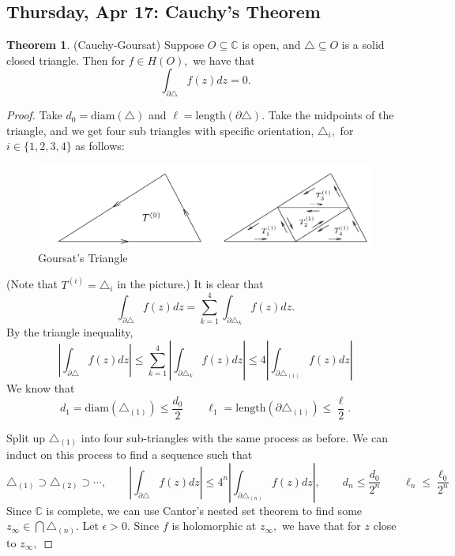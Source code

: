 \documentclass[10pt, oneside]{article}
\newcommand{\bbC}{\mathbb{C}}
\theoremstyle{definition}
\newtheorem{thm}{Theorem}
\newcommand{\bbC}{\mathbb{C}}
\begin{document}
\subsection{Thursday, Apr 17: Cauchy's Theorem}
\begin{thm}
    (Cauchy-Goursat) Suppose $O\subseteq \bbC$ is open, and $\triangle \subseteq O$ is a solid closed triangle. Then for $f\in H(O),$ we have that 
    \[\int_{\partial \triangle} f(z)dz = 0.\]
\end{thm}
\begin{proof}
Take $d_0= \text{diam}(\triangle)$ and $\ell = \text{length}(\partial \triangle).$
 Take the midpoints of the triangle, and we get four sub triangles with specific orientation, $\triangle_i,$ for $i\in \{1,2,3,4\}$ as follows: 
    \begin{figure}[H]
        \centering
        \includegraphics[width=0.5\linewidth]{Images/Goursat.png}
        \caption{Goursat's Triangle}
    \end{figure}
    (Note that $T^{(i)} = \triangle_i$ in the picture.) It is clear that 
    \[\int_{\partial \triangle} f(z)dz = \sum_{k=1}^4 \int_{\partial \triangle_k}f(z)dz.\] By the triangle inequality, 
    \[\left|\int_{\partial \triangle}f(z)dz\right| \leq \sum_{k=1}^4 \left|\int_{\partial \triangle_k}f(z)dz\right| \leq 4 \left|\int_{\partial \triangle_{(1)}}f(z)dz\right|\] We know that 
    \[d_1 = \text{diam}(\triangle_{(1)}) \leq \frac{d_0}{2} \qquad \ell_1 = \text{length}(\partial \triangle_{(1)}) \leq \frac{\ell}{2}.\]
    
    Split up $\triangle_{(1)}$ into four sub-triangles with the same process as before. We can induct on this process to find a sequence such that
    \[\triangle_{(1)}\supset \triangle_{(2)}\supset \cdots , \qquad \left|\int_{\partial \triangle}f(z)dz\right|  \leq 4^n \left|\int_{\partial \triangle_{(n)}}f(z)dz\right|, \qquad d_n \leq \frac{d_0}{2^n} \qquad \ell_n \leq \frac{\ell_0}{2^n}\] Since $\bbC$ is complete, we can use Cantor's nested set theorem to find some $z_\infty \in \bigcap \triangle_{(n)}.$ Let $\epsilon>0.$ Since $f$ is holomorphic at $z_\infty,$ we have that for $z$ close to $z_\infty,$ 
    

\end{proof}
\end{document}
